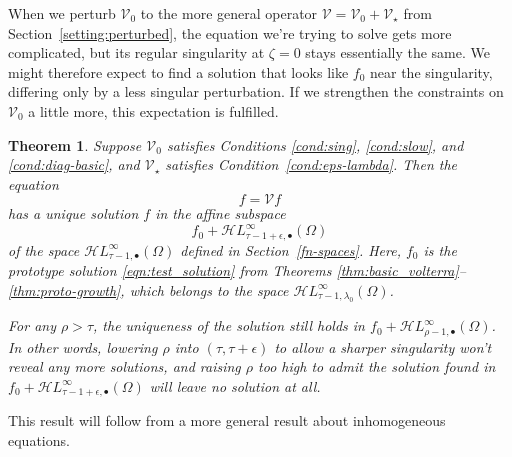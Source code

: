 \documentclass{article}
\theoremstyle{plain}
\newtheorem{thm}{Theorem}
\newcommand{\singexp}[2]{\mathcal{H}L^\infty_{#1, #2}}
\newcommand{\singexpalg}[1]{\singexp{#1}{\bullet}}
\newcommand{\volterra}{\mathcal{V}}
\newcommand{\hardpart}{\mathcal{V}_0}
\newcommand{\softpart}{\mathcal{V}_\star}
\newcommand{\solproto}{f_0}
\begin{document}



When we perturb $\hardpart$ to the more general operator $\volterra = \hardpart + \softpart$ from Section~\ref{setting:perturbed}, the equation we're trying to solve gets more complicated, but its regular singularity at $\zeta = 0$ stays essentially the same. We might therefore expect to find a solution that looks like $\solproto$ near the singularity, differing only by a less singular perturbation. If we strengthen the constraints on $\hardpart$ a little more, this expectation is fulfilled.
\begin{thm}\label{thm:general_volterra}
Suppose $\hardpart$ satisfies {\em Conditions \eqref{cond:sing}}, \eqref{cond:slow}, and \eqref{cond:diag-basic}, and $\softpart$ satisfies {\em Condition~\eqref{cond:eps-lambda}}. Then the equation
\[f = \volterra f\]
has a unique solution $f$ in the affine subspace
\[ f_0 + \singexpalg{\tau-1+\epsilon}(\Omega) \]
of the space $\singexpalg{\tau-1}(\Omega)$ defined in Section~\ref{fn-spaces}. Here, $f_0$ is the prototype solution \eqref{eqn:test_solution} from Theorems \ref{thm:basic_volterra}--\ref{thm:proto-growth}, which belongs to the space $\singexp{\tau-1}{\lambda_0}(\Omega)$.

For any $\rho > \tau$, the uniqueness of the solution still holds in $f_0 + \singexpalg{\rho-1}(\Omega)$. In other words, lowering $\rho$ into $(\tau, \tau+\epsilon)$ to allow a sharper singularity won't reveal any more solutions, and raising $\rho$ too high to admit the solution found in $f_0 + \singexpalg{\tau-1+\epsilon}(\Omega)$ will leave no solution at all.
\end{thm}
This result will follow from a more general result about inhomogeneous equations.
\end{document}
